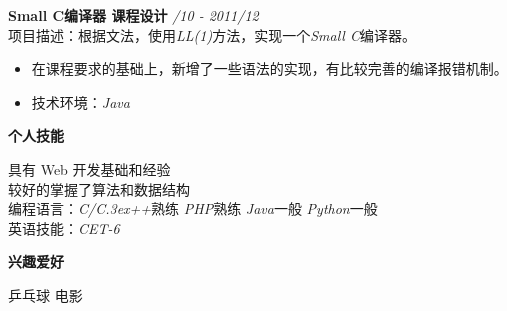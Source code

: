 \documentclass[a4paper]{article}
\newenvironment{changemargin}[2]{%
  \begin{list}{}{%
    \setlength{\topsep}{0pt}%
    \setlength{\leftmargin}{#1}%
    \setlength{\rightmargin}{#2}%
    \setlength{\listparindent}{\parindent}%
    \setlength{\itemindent}{\parindent}%
    \setlength{\parsep}{\parskip}%
  }%
  \item[]}{\end{list}
}
\newcommand{\lineover}{
	\begin{changemargin}{-0.05in}{-0.05in}
		\vspace*{-8pt}
		\hrulefill \\
		\vspace*{-2pt}
	\end{changemargin}
}
\newcommand{\header}[1]{
	\begin{changemargin}{-0.5in}{-0.5in}
		\scshape{\textbf{#1}}\\
	\end{changemargin}
}
\newenvironment{body} {
	\vspace*{-16pt}
	\begin{changemargin}{-0.25in}{-0.5in}
  }	
	{\end{changemargin}
}
\begin{document}
\begin{body}
	{\textbf{Small C编译器 课程设计}}{} \hfill \emph{/10 - 2011/12}\\
	项目描述：根据文法，使用\emph{\fontarial LL(1)}方法，实现一个\emph{\fontarial Small C}编译器。\\
	\vspace*{-6pt}
	\begin{itemize} \itemsep -0pt  %
		\item 在课程要求的基础上，新增了一些语法的实现，有比较完善的编译报错机制。\\
	\end{itemize}
	\vspace*{-12pt}
	\begin{itemize} \itemsep -0pt  %
		\item 技术环境：\emph{\fontarial Java}\\
	\end{itemize}
	
\end{body}

\medskip

\header{个人技能}

\begin{body}
	\vspace{14pt}
	具有 {\fontarial Web} 开发基础和经验\\
	较好的掌握了算法和数据结构\\
	编程语言：\emph{\fontarial C/C\raise.3ex\hbox{\small++}}熟练 \emph{\fontarial PHP}熟练 \emph{\fontarial Java}一般 \emph{\fontarial Python}一般\\
	英语技能：\emph{\fontarial CET-6}\\
\end{body}

\medskip


\header{兴趣爱好}

\begin{body}
	\vspace{14pt}
	乒乓球 电影\\
\end{body}
\end{document}
